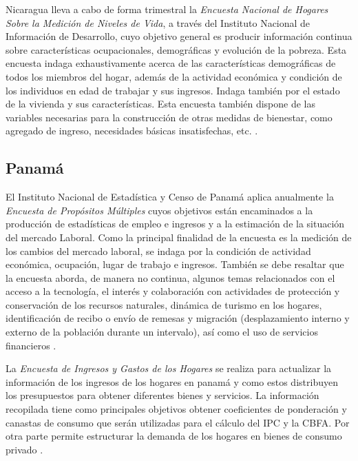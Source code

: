 \documentclass[
  10pt,
  spanish,
]{book}
\begin{document}
Nicaragua lleva a cabo de forma trimestral la \emph{Encuesta Nacional de Hogares Sobre la Medición de Niveles de Vida}, a través del Instituto Nacional de Información de Desarrollo, cuyo objetivo general es producir información continua sobre características ocupacionales, demográficas y evolución de la pobreza. Esta encuesta indaga exhaustivamente acerca de las características demográficas de todos los miembros del hogar, además de la actividad económica y condición de los individuos en edad de trabajar y sus ingresos. Indaga también por el estado de la vivienda y sus características. Esta encuesta también dispone de las variables necesarias para la construcción de otras medidas de bienestar, como agregado de ingreso, necesidades básicas insatisfechas, etc. \citep{INIDE-NI}.

\hypertarget{panamuxe1}{%
\subsection*{Panamá}\label{panamuxe1}}

El Instituto Nacional de Estadística y Censo de Panamá aplica anualmente la \emph{Encuesta de Propósitos Múltiples} cuyos objetivos están encaminados a la producción de estadísticas de empleo e ingresos y a la estimación de la situación del mercado Laboral. Como la principal finalidad de la encuesta es la medición de los cambios del mercado laboral, se indaga por la condición de actividad económica, ocupación, lugar de trabajo e ingresos. También se debe resaltar que la encuesta aborda, de manera no continua, algunos temas relacionados con el acceso a la tecnología, el interés y colaboración con actividades de protección y conservación de los recursos naturales, dinámica de turismo en los hogares, identificación de recibo o envío de remesas y migración (desplazamiento interno y externo de la población durante un intervalo), así como el uso de servicios financieros \citep{INEC-PA}.

La \emph{Encuesta de Ingresos y Gastos de los Hogares} se realiza para actualizar la información de los ingresos de los hogares en panamá y como estos distribuyen los presupuestos para obtener diferentes bienes y servicios. La información recopilada tiene como principales objetivos obtener coeficientes de ponderación y canastas de consumo que serán utilizadas para el cálculo del IPC y la CBFA. Por otra parte permite estructurar la demanda de los hogares en bienes de consumo privado \citep{INEC2-PA}.
\end{document}
